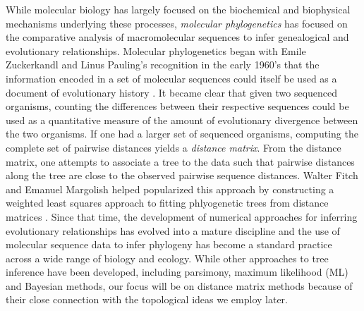 While molecular biology has largely focused on the biochemical and biophysical mechanisms underlying these processes, \emph{molecular phylogenetics} has focused on the comparative analysis of macromolecular sequences to infer genealogical and evolutionary relationships.
Molecular phylogenetics began with Emile Zuckerkandl and Linus Pauling's recognition in the early 1960's that the information encoded in a set of molecular sequences could itself be used as a document of evolutionary history \cite{Zuckerkandl:1962,Zuckerkandl:1965wi}.
It became clear that given two sequenced organisms, counting the differences between their respective sequences could be used as a quantitative measure of the amount of evolutionary divergence between the two organisms.
If one had a larger set of sequenced organisms, computing the complete set of pairwise distances yields a \emph{distance matrix}.
From the distance matrix, one attempts to associate a tree to the data such that pairwise distances along the tree are close to the observed pairwise sequence distances.
Walter Fitch and Emanuel Margolish helped popularized this approach by constructing a weighted least squares approach to fitting phlyogenetic trees from distance matrices \cite{Fitch:1967we}.
Since that time, the development of numerical approaches for inferring evolutionary relationships has evolved into a mature discipline and the use of molecular sequence data to infer phylogeny has become a standard practice across a wide range of biology and ecology.
While other approaches to tree inference have been developed, including parsimony, maximum likelihood (ML) and Bayesian methods, our focus will be on distance matrix methods because of their close connection with the topological ideas we employ later.


